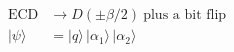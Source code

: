 \documentclass[12pt]{article}
\begin{document}
\fontsize{22}{28}\selectfont
\begin{align*}
\mathrm{ECD} &\to D(\pm\beta/2)\ \text{plus a bit flip} \\[0.45em]
|\psi\rangle &= |q\rangle\,|\alpha_1\rangle\,|\alpha_2\rangle
\end{align*}
\end{document}
